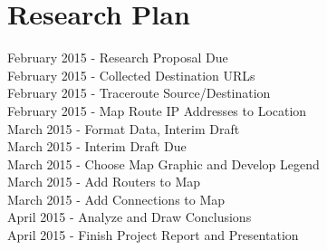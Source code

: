 \documentclass{sigcomm-alternate}
\begin{document}
\section{Research Plan}
\indent
{} February 2015 - Research Proposal Due \\
 February 2015 - Collected Destination URLs \\
 February 2015 - Traceroute Source/Destination \\
 February 2015 - Map Route IP Addresses to Location\\ 
 March 2015 - Format Data, Interim Draft \\
 March 2015 - Interim Draft Due \\
 March 2015 - Choose Map Graphic and Develop Legend \\
 March 2015 - Add Routers to Map \\
 March 2015 - Add Connections to Map \\
 April 2015 - Analyze and Draw Conclusions\\ 
 April 2015 - Finish Project Report and Presentation\\\




\end{document}
